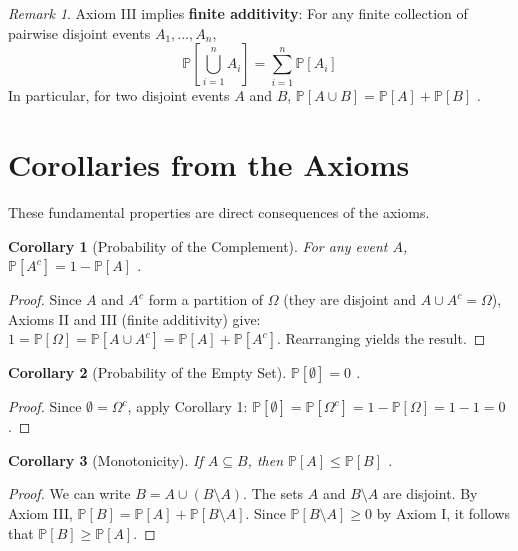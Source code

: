 \documentclass[12pt, a4paper]{article}
\theoremstyle{definition}
\theoremstyle{plain}
\newtheorem{corollary}{Corollary}[section]
\theoremstyle{remark}
\newtheorem{remark}{Remark}[section]
\begin{document}
\begin{remark}
    Axiom III implies \textbf{finite additivity}: For any finite collection of pairwise disjoint events $A_1, ..., A_n$,
    $$\mathbb{P}\left[\bigcup_{i=1}^{n} A_i\right] = \sum_{i=1}^{n} \mathbb{P}[A_i]$$
    In particular, for two disjoint events $A$ and $B$, $\mathbb{P}[A \cup B] = \mathbb{P}[A] + \mathbb{P}[B]$ \cite{chan}.
\end{remark}

\section{Corollaries from the Axioms}

These fundamental properties are direct consequences of the axioms.

\begin{corollary}[Probability of the Complement]
    For any event $A$, $\mathbb{P}[A^c] = 1 - \mathbb{P}[A]$ \cite{faculty_prob, ross, chan}.
\end{corollary}
\begin{proof}
    Since $A$ and $A^c$ form a partition of $\Omega$ (they are disjoint and $A \cup A^c = \Omega$), Axioms II and III (finite additivity) give:
    $1 = \mathbb{P}[\Omega] = \mathbb{P}[A \cup A^c] = \mathbb{P}[A] + \mathbb{P}[A^c]$. Rearranging yields the result.
\end{proof}

\begin{corollary}[Probability of the Empty Set]
    $\mathbb{P}[\emptyset] = 0$ \cite{faculty_prob, ross, chan}.
\end{corollary}
\begin{proof}
    Since $\emptyset = \Omega^c$, apply Corollary 1: $\mathbb{P}[\emptyset] = \mathbb{P}[\Omega^c] = 1 - \mathbb{P}[\Omega] = 1 - 1 = 0$.
\end{proof}

\begin{corollary}[Monotonicity]
    If $A \subseteq B$, then $\mathbb{P}[A] \le \mathbb{P}[B]$ \cite{chan}.
\end{corollary}
\begin{proof}
    We can write $B = A \cup (B \setminus A)$. The sets $A$ and $B \setminus A$ are disjoint. By Axiom III, $\mathbb{P}[B] = \mathbb{P}[A] + \mathbb{P}[B \setminus A]$. Since $\mathbb{P}[B \setminus A] \ge 0$ by Axiom I, it follows that $\mathbb{P}[B] \ge \mathbb{P}[A]$.
\end{proof}
\end{document}
